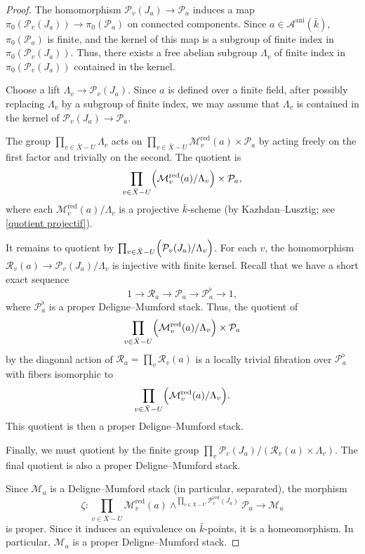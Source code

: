 \documentclass[12pt,english]{smfart}
\numberwithin{equation}{subsection}
\theoremstyle{remark}
\begin{document}
\begin{proof}
The homomorphism $\mathcal{P}_v(J_a)\rightarrow \mathcal{P}_a$ induces a map $\pi_0(\mathcal{P}_v(J_a))\rightarrow \pi_0(\mathcal{P}_a)$ on connected components.
Since $a\in\mathcal{A}^\mathrm{ani}(\bar{k})$, $\pi_0(\mathcal{P}_a)$ is finite,
and the kernel of this map is a subgroup of finite index in $\pi_0(\mathcal{P}_v(J_a))$.
Thus, there exists a free abelian subgroup $\Lambda_v$ of finite index in $\pi_0(\mathcal{P}_v(J_a))$ contained in the kernel.

Choose a lift $\Lambda_v\rightarrow \mathcal{P}_v(J_a)$.
Since $a$ is defined over a finite field, after possibly replacing $\Lambda_v$ by a subgroup of finite index,
we may assume that $\Lambda_v$ is contained in the kernel of $\mathcal{P}_v(J_a)\rightarrow \mathcal{P}_a$.

The group $\prod_{v\in\bar X-U}\Lambda_v$ acts on $\prod_{v\in\bar X-U}\mathcal{M}_v^{\mathrm{red}}(a)\times \mathcal{P}_a$
by acting freely on the first factor and trivially on the second. The quotient is
$$
\prod_{v\in\bar X-U}\Bigl(\mathcal{M}_v^{\mathrm{red}}(a)/ \Lambda_v\Bigr)\times \mathcal{P}_a,
$$
where each $\mathcal{M}_v^{\mathrm{red}}(a)/ \Lambda_v$ is a projective $\bar{k}$-scheme (by Kazhdan--Lusztig; see \ref{quotient projectif}).

It remains to quotient by $\prod_{v\in\bar X-U}\Bigl(\mathcal{P}_v(J_a)/ \Lambda_v\Bigr)$.
For each $v$, the homomorphism $\mathcal{R}_v(a)\rightarrow \mathcal{P}_v(J_a)/ \Lambda_v$ is injective with finite kernel.
Recall that we have a short exact sequence
$$
1\rightarrow \mathcal{R}_a\rightarrow \mathcal{P}_a\rightarrow \mathcal{P}_a^\flat\rightarrow 1,
$$
where $\mathcal{P}_a^\flat$ is a proper Deligne--Mumford stack.
Thus, the quotient of
$$
\prod_{v\in\bar X-U}\Bigl(\mathcal{M}_v^{\mathrm{red}}(a)/ \Lambda_v\Bigr)\times \mathcal{P}_a
$$
by the diagonal action of $\mathcal{R}_a=\prod_v \mathcal{R}_v(a)$ is a locally trivial fibration over $\mathcal{P}_a^\flat$
with fibers isomorphic to
$$
\prod_{v\in\bar X-U}\Bigl(\mathcal{M}_v^{\mathrm{red}}(a)/ \Lambda_v\Bigr).
$$
This quotient is then a proper Deligne--Mumford stack.

Finally, we must quotient by the finite group $\prod_v \mathcal{P}_v(J_a)/(\mathcal{R}_v(a)\times \Lambda_v)$.
The final quotient is also a proper Deligne--Mumford stack.

Since $\mathcal{M}_a$ is a Deligne--Mumford stack (in particular, separated), the morphism
$$
\zeta:\prod_{v\in\bar X-U}\mathcal{M}_v^{\mathrm{red}}(a)
\wedge^{\prod_{v\in\bar X-U}\mathcal{P}_v^{\mathrm{red}}(J_a)} \mathcal{P}_a\longrightarrow \mathcal{M}_a
$$
is proper. Since it induces an equivalence on $\bar{k}$-points, it is a homeomorphism.
In particular, $\mathcal{M}_a$ is a proper Deligne--Mumford stack.
\end{proof}
\end{document}
